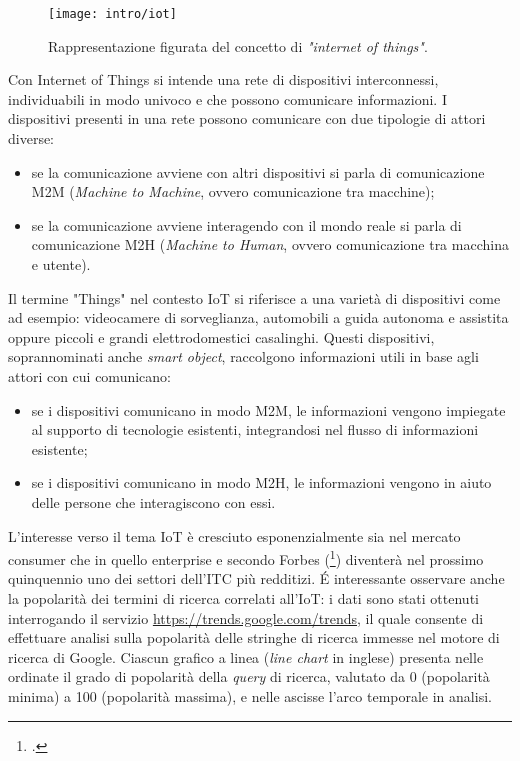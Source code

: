 \begin{figure}[H]
    \centering
    \texttt{[image: intro/iot]}
    \caption{Rappresentazione figurata del concetto di \textit{"internet of things"}.}
    \label{fig:iot}
\end{figure}

Con Internet of Things si intende una rete di dispositivi interconnessi, individuabili in modo univoco e che possono comunicare informazioni.
I dispositivi presenti in una rete possono comunicare con due tipologie di attori diverse:
\begin{itemize}
  \item se la comunicazione avviene con altri dispositivi si parla di comunicazione M2M (\textit{Machine to Machine}, ovvero comunicazione tra macchine);
  \item se la comunicazione avviene interagendo con il mondo reale si parla di comunicazione M2H (\textit{Machine to Human}, ovvero comunicazione tra macchina e utente).
\end{itemize}


Il termine "Things" nel contesto IoT si riferisce a una varietà di dispositivi come ad esempio: videocamere di sorveglianza, automobili a guida autonoma e assistita oppure piccoli e grandi elettrodomestici casalinghi. Questi dispositivi, soprannominati anche \textit{smart object}, raccolgono informazioni utili in base agli attori con cui comunicano:
\begin{itemize}
  \item se i dispositivi comunicano in modo M2M, le informazioni vengono impiegate al supporto di tecnologie esistenti, integrandosi nel flusso di informazioni esistente;
  \item se i dispositivi comunicano in modo M2H, le informazioni vengono in aiuto delle persone che interagiscono con essi.
\end{itemize}


L'interesse verso il tema IoT è cresciuto esponenzialmente sia nel mercato consumer che in quello enterprise e secondo Forbes (\footcite{site:forbes-iot}) diventerà nel prossimo quinquennio uno dei settori dell'ITC più redditizi.
É interessante osservare anche la popolarità dei termini di ricerca correlati all'IoT: i dati sono stati ottenuti interrogando il servizio \url{https://trends.google.com/trends}, il quale consente di effettuare analisi sulla popolarità delle stringhe di ricerca immesse nel motore di ricerca di Google.
Ciascun grafico a linea (\textit{line chart} in inglese) presenta nelle ordinate il grado di popolarità della \textit{query} di ricerca, valutato da 0 (popolarità minima) a 100 (popolarità massima), e nelle ascisse l'arco temporale in analisi.

